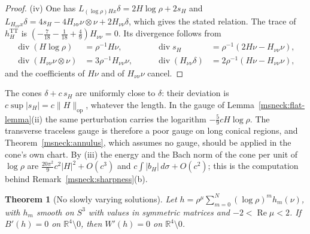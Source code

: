 \documentclass[11pt]{article}
\numberwithin{equation}{section}
\newtheorem{theorem}{Theorem}[section]
\theoremstyle{definition}
\theoremstyle{remark}
\begin{document}
\begin{proof}
(iv) One has \(L_{(\log\rho)Hx}\delta=2H\log\rho+2s_H\) and
\(L_{H_{\nu\nu}x}\delta=4s_H-4H_{\nu\nu}\nu\otimes\nu+2H_{\nu\nu}\delta\),
which gives the stated relation. The trace of \(h_H^{\mathrm{TT}}\) is
\((-\tfrac7{18}-\tfrac1{18}+\tfrac49)H_{\nu\nu}=0\). Its divergence follows
from
\[
 \begin{aligned}
 \operatorname{div}(H\log\rho)&=\rho^{-1}H\nu,&\qquad
 \operatorname{div}s_H&=\rho^{-1}(2H\nu-H_{\nu\nu}\nu),\\
 \operatorname{div}(H_{\nu\nu}\nu\otimes\nu)&=3\rho^{-1}H_{\nu\nu}\nu,&\qquad
 \operatorname{div}(H_{\nu\nu}\delta)&=2\rho^{-1}(H\nu-H_{\nu\nu}\nu),
 \end{aligned}
\]
and the coefficients of \(H\nu\) and of \(H_{\nu\nu}\nu\) cancel.
\end{proof}

The cones \(\delta+c\,s_H\) are uniformly close to \(\delta\): their
deviation is \(c\sup|s_H|=c\|H\|_{\mathrm{op}}\), whatever the length. In
the gauge of Lemma~\ref{msneck:flat-lemma}(ii) the same perturbation
carries the logarithm \(-\tfrac59cH\log\rho\). The transverse traceless
gauge is therefore a poor gauge on long conical regions, and
Theorem~\ref{msneck:annulus}, which assumes no gauge, should be applied
in the cone's own chart. By (iii) the energy and the Bach norm of the
cone per unit of \(\log\rho\) are \(\tfrac{20\pi^2}9c^2|H|^2+O(c^3)\) and
\(c\int|b_H|\,d\sigma+O(c^2)\); this is the computation behind
Remark~\ref{msneck:sharpness}(b).

\begin{theorem}[No slowly varying solutions]\label{msneck:liouville}
Let \(h=\rho^\mu\sum_{m=0}^N(\log\rho)^mh_m(\nu)\), with \(h_m\) smooth on
\(S^3\) with values in symmetric matrices and \(-2<\operatorname{Re}\mu<2\).
If \(B'(h)=0\) on \(\mathbb R^4\setminus0\), then \(W'(h)=0\) on
\(\mathbb R^4\setminus0\).
\end{theorem}
\end{document}
